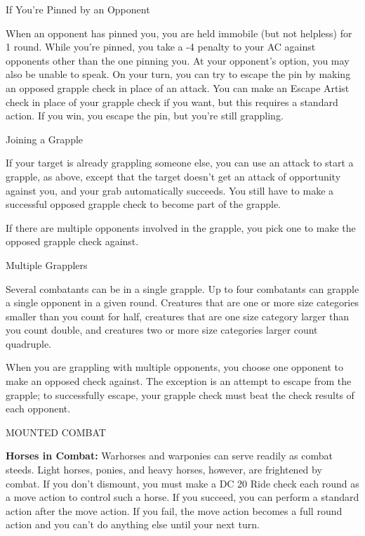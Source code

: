 \documentclass{article}
\begin{document}
\vspace{12pt}
If You're Pinned by an Opponent

When an opponent has pinned you, you are held immobile (but not helpless) for 1 
round. While you're pinned, you take a -4 penalty to your AC against opponents 
other than the one pinning you. At your opponent's option, you may also be unable 
to speak. On your turn, you can try to escape the pin by making an opposed grapple 
check in place of an attack. You can make an Escape Artist check in place of your 
grapple check if you want, but this requires a standard action. If you win, you 
escape the pin, but you're still grappling.

\vspace{12pt}
Joining a Grapple

If your target is already grappling someone else, you can use an attack to start 
a grapple, as above, except that the target doesn't get an attack of opportunity 
against you, and your grab automatically succeeds. You still have to make a successful 
opposed grapple check to become part of the grapple.

If there are multiple opponents involved in the grapple, you pick one to make the 
opposed grapple check against.

\vspace{12pt}
Multiple Grapplers

Several combatants can be in a single grapple. Up to four combatants can grapple 
a single opponent in a given round. Creatures that are one or more size categories 
smaller than you count for half, creatures that are one size category larger than 
you count double, and creatures two or more size categories larger count quadruple.

When you are grappling with multiple opponents, you choose one opponent to make 
an opposed check against. The exception is an attempt to escape from the grapple; 
to successfully escape, your grapple check must beat the check results of each 
opponent.

\vspace{12pt}
MOUNTED COMBAT

\textbf{Horses in Combat: }Warhorses and warponies can serve readily as combat 
steeds. Light horses, ponies, and heavy horses, however, are frightened by combat. 
If you don't dismount, you must make a DC 20 Ride check each round as a move action 
to control such a horse. If you succeed, you can perform a standard action after 
the move action. If you fail, the move action becomes a full round action and you 
can't do anything else until your next turn.
\end{document}
